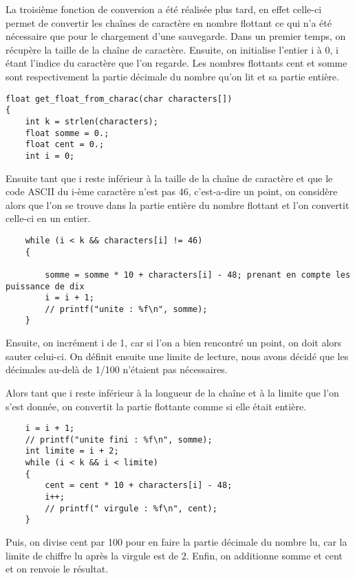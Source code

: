 \documentclass[a4paper, 12pt]{article}
\begin{document}
                La troisième fonction de conversion a été réalisée plus tard, en effet celle-ci permet de convertir les chaînes de caractère en nombre flottant ce qui n'a été nécessaire que pour le chargement d'une sauvegarde.
                Dans un premier temps, on récupère la taille de la chaîne de caractère. Ensuite, on initialise l'entier i à 0, i étant l'indice du caractère que l'on regarde.
                Les nombres flottants cent et somme sont respectivement la partie décimale du nombre qu'on lit et sa partie entière.
                 \begin{lstlisting}
float get_float_from_charac(char characters[])
{
    int k = strlen(characters);
    float somme = 0.;
    float cent = 0.;
    int i = 0;
                \end{lstlisting}
                Ensuite tant que i reste inférieur à la taille de la chaîne de caractère et que le code ASCII du i-ème caractère n'est pas 46, c'est-a-dire un point, on considère alors que l'on se trouve dans la partie entière du nombre flottant et l'on convertit celle-ci en un entier.
                
                
                                        \begin{lstlisting}
    while (i < k && characters[i] != 46)
    {

        somme = somme * 10 + characters[i] - 48; prenant en compte les puissance de dix
        i = i + 1;
        // printf("unite : %f\n", somme);
    }
                \end{lstlisting}
                Ensuite, on incrément i de 1, car si l'on a bien rencontré un point, on doit alors sauter celui-ci. On définit ensuite une limite de lecture, nous avons décidé que les décimales au-delà de 1/100 n'étaient pas nécessaires. 
                
                Alors tant que i reste inférieur à la longueur de la chaîne et à la limite que l'on s'est donnée,
                on convertit la partie flottante comme si elle était entière.
                
                
                
                
                                \begin{lstlisting}
    i = i + 1;
    // printf("unite fini : %f\n", somme);
    int limite = i + 2;
    while (i < k && i < limite)
    {
        cent = cent * 10 + characters[i] - 48;
        i++;
        // printf(" virgule : %f\n", cent);
    }
                \end{lstlisting}
                Puis, on divise cent par 100 pour en faire la partie décimale du nombre lu, car la limite de chiffre lu après la virgule est de 2.
                Enfin, on additionne somme et cent et on renvoie le résultat. 
                
\end{document}
